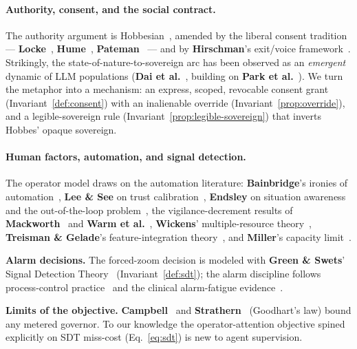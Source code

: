 \documentclass[11pt,a4paper]{article}
\theoremstyle{definition}
\theoremstyle{plain}
\begin{document}
\paragraph{Authority, consent, and the social contract.}
The authority argument is Hobbesian~, amended by the
liberal consent tradition --- \textbf{Locke}~,
\textbf{Hume}~, \textbf{Pateman}~ --- and by
\textbf{Hirschman}'s exit/voice framework~. Strikingly, the
state-of-nature-to-sovereign arc has been observed as an \emph{emergent} dynamic of
LLM populations (\textbf{Dai et al.}~, building on \textbf{Park et
al.}~). We turn the metaphor into a mechanism: an express, scoped,
revocable consent grant (Invariant~\ref{def:consent}) with an inalienable override
(Invariant~\ref{prop:override}), and a legible-sovereign rule
(Invariant~\ref{prop:legible-sovereign}) that inverts Hobbes' opaque sovereign.

\paragraph{Human factors, automation, and signal detection.}
The operator model draws on the automation literature:
\textbf{Bainbridge}'s ironies of automation~,
\textbf{Lee \& See} on trust calibration~,
\textbf{Endsley} on situation awareness and the out-of-the-loop
problem~, the vigilance-decrement results of
\textbf{Mackworth}~ and \textbf{Warm et al.}~,
\textbf{Wickens}' multiple-resource theory~,
\textbf{Treisman \& Gelade}'s feature-integration theory~, and
\textbf{Miller}'s capacity limit~.

\noindent\textbf{Alarm decisions.} The forced-zoom decision is
modeled with \textbf{Green \& Swets}' Signal Detection Theory~
(Invariant~\ref{def:sdt}); the alarm discipline follows process-control
practice~ and the clinical alarm-fatigue evidence~.

\noindent\textbf{Limits of the objective.}
\textbf{Campbell}~ and \textbf{Strathern}~
(Goodhart's law) bound any metered governor. To our knowledge the operator-attention
objective spined explicitly on SDT miss-cost (Eq.~\ref{eq:sdt}) is new to agent
supervision.
\end{document}

